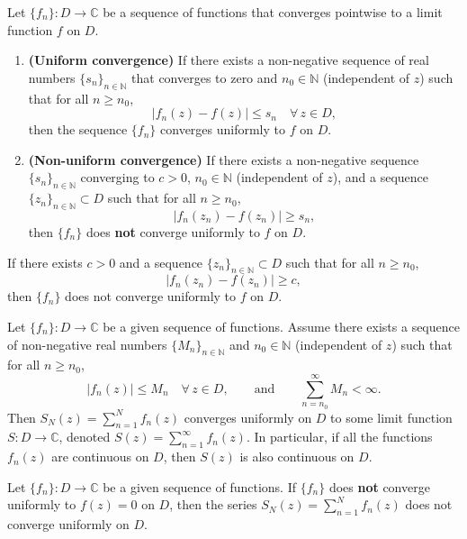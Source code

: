 \documentclass[11pt, a4paper]{article}
\begin{document}
\begin{thmbox}
Let $\{f_n\}:D\to\mathbb{C}$ be a sequence of functions that converges pointwise to a limit function $f$ on $D$.
\begin{enumerate}
  \item \textbf{(Uniform convergence)} If there exists a non-negative sequence of real numbers $\{s_n\}_{n\in\mathbb{N}}$ that converges to zero and $n_0\in\mathbb{N}$ (independent of $z$) such that for all $n\geq n_0$,
  \[
    |f_n(z)-f(z)|\leq s_n \quad \forall\, z\in D,
  \]
  then the sequence $\{f_n\}$ converges uniformly to $f$ on $D$.
  \item \textbf{(Non-uniform convergence)} If there exists a non-negative sequence $\{s_n\}_{n\in\mathbb{N}}$ converging to $c>0$, $n_0\in\mathbb{N}$ (independent of $z$), and a sequence $\{z_n\}_{n\in\mathbb{N}}\subset D$ such that for all $n\geq n_0$,
  \[
    |f_n(z_n)-f(z_n)|\geq s_n,
  \]
  then $\{f_n\}$ does \textbf{not} converge uniformly to $f$ on $D$.
\end{enumerate}
\begin{warnbox}
If there exists $c>0$ and a sequence $\{z_n\}_{n\in\mathbb{N}}\subset D$ such that for all $n\geq n_0$,
\[
  |f_n(z_n)-f(z_n)|\geq c,
\]
then $\{f_n\}$ does not converge uniformly to $f$ on $D$.
\end{warnbox}
\end{thmbox}

\begin{thmbox}
Let $\{f_n\}:D\to\mathbb{C}$ be a given sequence of functions. Assume there exists a sequence of non-negative real numbers $\{M_n\}_{n\in\mathbb{N}}$ and $n_0\in\mathbb{N}$ (independent of $z$) such that for all $n\geq n_0$,
\[
  |f_n(z)|\leq M_n \quad\forall\,z\in D, \qquad \text{and} \qquad \sum_{n=n_0}^{\infty}M_n<\infty.
\]
Then $S_N(z)=\sum_{n=1}^{N}f_n(z)$ converges uniformly on $D$ to some limit function $S:D\to\mathbb{C}$, denoted $S(z)=\sum_{n=1}^{\infty}f_n(z)$. In particular, if all the functions $f_n(z)$ are continuous on $D$, then $S(z)$ is also continuous on $D$.
\end{thmbox}

\begin{thmbox}
Let $\{f_n\}:D\to\mathbb{C}$ be a given sequence of functions. If $\{f_n\}$ does \textbf{not} converge uniformly to $f(z)=0$ on $D$, then the series $S_N(z)=\sum_{n=1}^{N}f_n(z)$ does not converge uniformly on $D$.
\end{thmbox}
\end{document}
